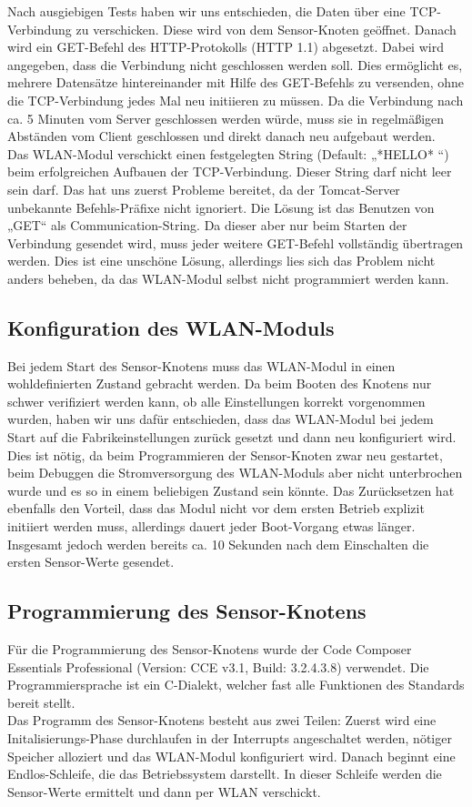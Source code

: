 \documentclass[12pt,a4paper,twoside]{article}
\begin{document}
Nach ausgiebigen Tests haben wir uns entschieden, die Daten über eine TCP-Verbindung zu verschicken. Diese wird von dem Sensor-Knoten geöffnet. Danach wird ein GET-Befehl des HTTP-Protokolls (HTTP 1.1) abgesetzt. Dabei wird angegeben, dass die Verbindung nicht geschlossen werden soll. Dies ermöglicht es, mehrere Datensätze hintereinander mit Hilfe des GET-Befehls zu versenden, ohne die TCP-Verbindung jedes Mal neu initiieren zu müssen. Da die Verbindung nach ca. 5 Minuten vom Server geschlossen werden würde, muss sie in regelmäßigen Abständen vom Client geschlossen und direkt danach neu aufgebaut werden.  \\
Das WLAN-Modul verschickt einen festgelegten String (Default: „*HELLO* “) beim erfolgreichen Aufbauen der TCP-Verbindung. Dieser String darf nicht leer sein darf. Das hat uns zuerst Probleme bereitet, da der Tomcat-Server unbekannte Befehls-Präfixe nicht ignoriert. Die Lösung ist das Benutzen von „GET“ als Communication-String. Da dieser aber nur beim Starten der Verbindung gesendet wird, muss jeder weitere GET-Befehl vollständig übertragen werden. Dies ist eine unschöne Lösung, allerdings lies sich das Problem nicht anders beheben, da das WLAN-Modul selbst nicht programmiert werden kann.

\subsection{Konfiguration des WLAN-Moduls}
Bei jedem Start des Sensor-Knotens muss das WLAN-Modul in einen wohldefinierten Zustand gebracht werden. Da beim Booten des Knotens nur schwer verifiziert werden kann, 
ob alle Einstellungen korrekt vorgenommen wurden, haben wir uns dafür entschieden, dass das WLAN-Modul bei jedem Start auf die Fabrikeinstellungen  zurück gesetzt und dann neu konfiguriert wird. 
Dies ist nötig, da beim Programmieren der Sensor-Knoten zwar neu gestartet, beim Debuggen die Stromversorgung des WLAN-Moduls aber nicht unterbrochen wurde und es so in einem beliebigen Zustand sein könnte. 
Das Zurücksetzen hat ebenfalls den Vorteil, dass das Modul nicht vor dem ersten Betrieb explizit initiiert werden muss, allerdings dauert jeder Boot-Vorgang etwas länger. Insgesamt jedoch werden bereits ca. 10 Sekunden nach dem Einschalten die ersten Sensor-Werte gesendet. 


\subsection{Programmierung des Sensor-Knotens}
Für die Programmierung des Sensor-Knotens wurde der Code Composer Essentials Professional (Version: CCE v3.1, Build: 3.2.4.3.8)  verwendet. Die Programmiersprache ist ein C-Dialekt, welcher fast alle Funktionen des Standards bereit stellt. \\
Das Programm des Sensor-Knotens besteht aus zwei Teilen: Zuerst wird eine Initalisierungs-Phase durchlaufen in der Interrupts angeschaltet werden, nötiger Speicher alloziert und das WLAN-Modul konfiguriert wird. Danach beginnt eine Endlos-Schleife, die das Betriebssystem darstellt. 
In dieser Schleife werden die Sensor-Werte ermittelt und dann per WLAN verschickt.
\end{document}
